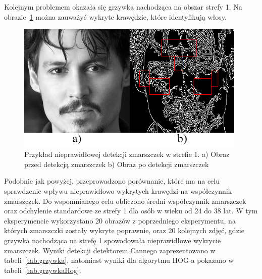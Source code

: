 \documentclass[a4paper,twoside,12pt]{book}
\begin{document}
    Kolejnym problemem okazała się grzywka nachodząca na obszar strefy 1.
    Na obrazie~\ref{fig.grzywka} można zauważyć wykryte krawędzie,
    które identyfikują włosy.
    \begin{figure}[]
        \centering
        \includegraphics[width=11cm]{Obrazy/zlyRyjekZGrzywka.jpg}
        \captionsetup{justification=centering}
        \caption{Przykład nieprawidłowej detekcji zmarszczek w strefie 1. \newline
        a) Obraz przed detekcją zmarszczek b) Obraz po detekcji zmarszczek }
        \label{fig.grzywka}
    \end{figure}
    Podobnie jak powyżej, przeprowadzono porównanie,
    które ma na celu sprawdzenie wpływu nieprawidłowo wykrytych krawędzi na współczynnik zmarszczek.
    Do wspomnianego celu obliczono średni współczynnik zmarszczek oraz odchylenie standardowe ze strefy 1 dla osób w
    wieku od 24 do 38 lat. W tym eksperymencie wykorzystano 20 obrazów z poprzedniego eksperymentu, na których
    zmarszczki zostały wykryte poprawnie, oraz 20 kolejnych zdjęć, gdzie grzywka nachodząca na strefę 1
    spowodowała nieprawidłowe wykrycie zmarszczek. Wyniki detekcji detektorem Cannego zaprezentowano w
    tabeli~\ref{tab.grzywka}, natomiast wyniki dla algorytmu HOG-a pokazano w tabeli~\ref{tab.grzywkaHog}.
\end{document}
